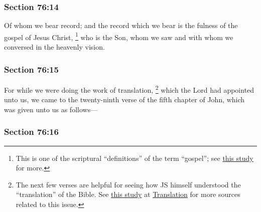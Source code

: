 	\subsubsection{Section 76:14} %
		\label{DC76-14}

		Of whom we bear record; and the record which we bear is the fulness of the gospel of Jesus Christ,%
			\footnote{%
				\label{DC76-14-gospel}%
				This is one of the scriptural ``definitions'' of the term ``gospel''; see \hyperref[GOSPEL-definition]{this study} for more.
				}
		who is the Son, whom we saw and with whom we conversed in the heavenly vision.


	\subsubsection{Section 76:15} %
		\label{DC76-15}

		For while we were doing the work of translation,%
			\footnote{%
				\label{DC76-15-translation}%
				The next few verses are helpful for seeing how JS himself understood the ``translation'' of the Bible. See \hyperref[TRANSLATION-meaning]{this study} at \hyperref[TRANSLATION]{Translation} for more sources related to this issue.
				}
		which the Lord had appointed unto us, we came to the twenty-ninth verse of the fifth chapter of John, which was given unto us as follows---


	\subsubsection{Section 76:16} %
		\label{DC76-16}

